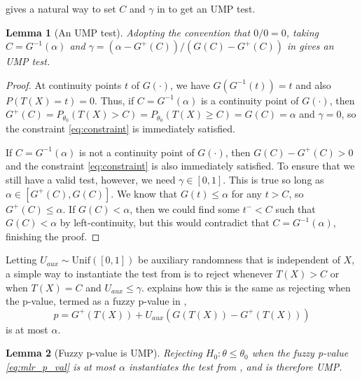 \documentclass{article}
\newtheorem{lemma}{Lemma}
\begin{document}
\begin{appendix}
 gives a natural way to set $C$ and $\gamma$ in  to get an UMP test. 

\begin{lemma}[An UMP test]
    \label{lem:setting_constants} Adopting the convention that $0/0 = 0$, taking $C = G^{-1}(\alpha)$ and $\gamma = (\alpha - G^+(C))/(G(C) - G^+(C))$
    in  gives an UMP test.
\end{lemma}

\begin{proof}
    At continuity points $t$ of $G(\cdot)$, we have $G(G^{-1}(t)) = t$ and also $P(T(X) = t) = 0$. Thus, if $C = G^{-1}(\alpha)$ is a continuity point of $G(\cdot)$, then $G^+(C) = P_{\theta_0}(T(X) > C) = P_{\theta_0}(T(X) \geq C) = G(C) = \alpha$ and $\gamma=0$, so the constraint \eqref{eq:constraint} is immediately satisfied. 

    If $C = G^{-1}(\alpha)$ is not a continuity point of $G(\cdot)$, then $G(C) - G^+(C) > 0$ and the constraint \eqref{eq:constraint} is also immediately satisfied. To ensure that we still have a valid test, however, we need $\gamma \in [0, 1]$. This is true so long as $\alpha \in [G^{+}(C), G(C)]$. We know that $G(t) \leq \alpha$ for any $t > C$, so $G^{+}(C) \leq \alpha$. If $G(C) < \alpha$, then we could find some $t^{-} < C$ such that $G(C) < \alpha$ by left-continuity, but this would contradict that $C = G^{-1}(\alpha)$, finishing the proof. 
\end{proof}

Letting $U_{aux} \sim \text{Unif}([0, 1])$ be auxiliary randomness that is independent of $X$, a simple way to instantiate the test from  is to reject whenever $T(X) > C$ or when $T(X) = C$ and $U_{aux} \leq \gamma$.  explains how this is the same as rejecting when the p-value, termed as a fuzzy p-value in \cite{Geyer}, 
\begin{equation}
    \label{eq:mlr_p_val}
    p = G^+(T(X)) + U_{aux}(G(T(X)) - G^+(T(X))) 
\end{equation}
is at most $\alpha$. 

\begin{lemma}[Fuzzy p-value is UMP]
    \label{lem:fuzzy}
    Rejecting $H_0: \theta \leq \theta_0$ when the fuzzy p-value \eqref{eq:mlr_p_val} is at most $\alpha$ instantiates the test from , and is therefore UMP. 
\end{lemma}


\end{appendix}
\end{document}
